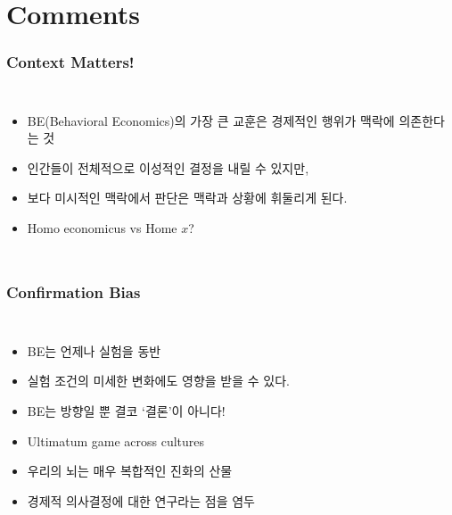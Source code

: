 \documentclass[final]{beamer}
\begin{document}
\section{Comments}
%
\begin{frame}\frametitle{Context Matters!}\vspace{3.5em}
\begin{columns}[c]
\column{15em}
\begin{itemize}
	\item BE(Behavioral Economics)의 가장 큰 교훈은 경제적인 행위가 맥락에 의존한다는 것  
	\item 인간들이 전체적으로 이성적인 결정을 내릴 수 있지만, 
	\item 보다 미시적인 맥락에서 판단은 맥락과 상황에 휘둘리게 된다. 
	\item Homo economicus vs Home $x$?
\end{itemize}
\column{16em}
\end{columns}
\end{frame}
%
\begin{frame}\frametitle{Confirmation Bias}\vspace{.5em}
\begin{columns}[c]
\column{16em}
\begin{itemize}
	\item BE는 언제나 실험을 동반   
	\item 실험 조건의 미세한 변화에도 영향을 받을 수 있다. 
	\item BE는 방향일 뿐 결코 `결론'이 아니다! 
	\item Ultimatum game across cultures 
	\item 우리의 뇌는 매우 복합적인 진화의 산물
	\item 경제적 의사결정에 대한 연구라는 점을 염두 
\end{itemize}
\column{14em}
\hspace{0em}
\end{columns}
\end{frame}
\end{document}
